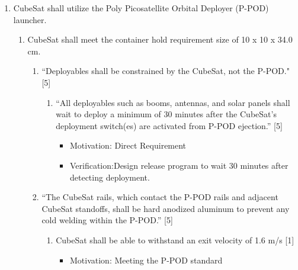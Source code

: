 \documentclass{ece}
\begin{document}
\begin{enumerate}
\begin{enumerate}
\begin{enumerate}
\begin{enumerate}
\begin{itemize}
                        \item Motivation: Delicate components such as PCBs and antenna have natural frequencies which must be avoided to avoid resonance. Resonance could result in the failure of components.
                        \item Verification: Use ANSYS’s modal analysis features on specific parts and on the assembled CAD model.
                    \end{itemize}
        \end{enumerate}
        \end{enumerate}
    \end{enumerate}  %
    \item CubeSat shall utilize the Poly Picosatellite Orbital Deployer (P-POD) launcher.
    \begin{enumerate}
        \item CubeSat shall meet the container hold requirement size of 10 x 10 x 34.0 cm. 
        \begin{enumerate}
            \item  “Deployables shall be constrained by the CubeSat, not the P-POD." [5] 
                \begin{enumerate}
                    \item “All deployables such as booms, antennas, and solar panels shall wait to deploy a minimum of 30 minutes after the CubeSat's deployment switch(es) are activated from P-POD ejection.” [5] 
                        \begin{itemize}
                            \item Motivation: Direct Requirement
                            \item Verification:Design release program to wait 30 minutes after detecting deployment. 
                        \end{itemize}
                \end{enumerate}
            \item  “The CubeSat rails, which contact the P-POD rails and adjacent CubeSat standoffs, shall be hard anodized aluminum to prevent any cold welding within the P-POD.” [5]
                \begin{enumerate}
                    \item CubeSat shall be able to withstand an exit velocity of 1.6 m/s [1] 
                           \begin{itemize}
                                \item Motivation: Meeting the P-POD standard

\end{itemize}
\end{enumerate}
\end{enumerate}
\end{enumerate}
\end{enumerate}
\end{document}
